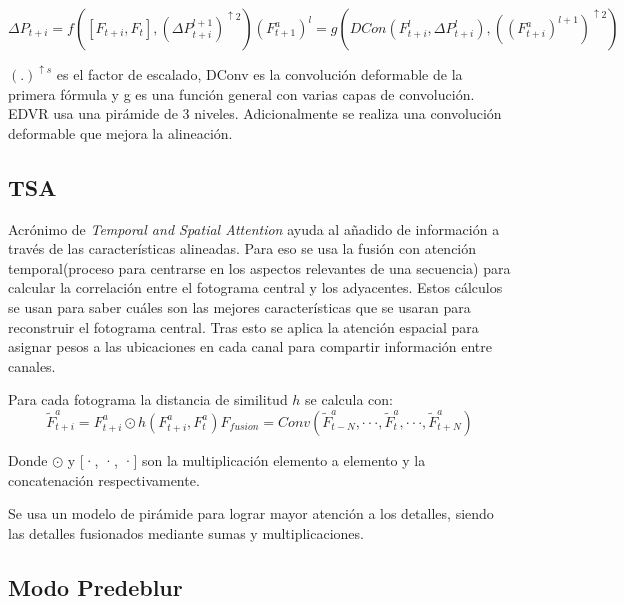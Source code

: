         \begin{equation}\label{39}
          \Delta P_{t+i} = f([F_{t+i}, F_t], (\Delta P^{l+1}_{t+i})^{\uparrow 2})
          (F^a_{t+1})^l = g(DCon(F^l_{t+i},\Delta P^l_{t+i}), ((F^a_{t+i})^{l+1})^{\uparrow 2})
        \end{equation}

        $(.)^{\uparrow s}$ es el factor de escalado, DConv es la convolución deformable de la primera fórmula y g es  una función general con varias capas de convolución. 
        EDVR usa una pirámide de 3 niveles.
         Adicionalmente se realiza una convolución deformable que mejora la alineación.

    \subsection {TSA}
        Acrónimo de \emph{Temporal and Spatial Attention} ayuda al añadido de información a través de las características alineadas. Para eso se usa la fusión con atención temporal(proceso para centrarse en los aspectos relevantes de una secuencia) para calcular la correlación entre el fotograma central y los adyacentes. Estos cálculos se usan para saber cuáles son las mejores características que se usaran para reconstruir el fotograma central. Tras esto se aplica la atención espacial para asignar pesos a las ubicaciones en cada canal para compartir información entre canales.
        
    
        Para cada fotograma la distancia de similitud $h$ se calcula con:
        \begin{equation}\label{48}
        \tilde{F}^a_{t+i} = F^a_{t+i} \odot h(F^a_{t+i}, F^a_t)
        F_{fusion} = Conv(\tilde{F}^a_{t-N}, \cdot\cdot\cdot, \tilde{F}^a_{t},\cdot\cdot\cdot, \tilde{F}^a_{t+N} )
        \end{equation}
        
        Donde $\odot $  y  [·, ·, ·] son la multiplicación elemento a elemento y la concatenación respectivamente.
        
        Se usa un modelo de pirámide para lograr mayor atención a los detalles, siendo las detalles fusionados mediante sumas y  multiplicaciones.
        
    \subsection{Modo Predeblur}    
    
